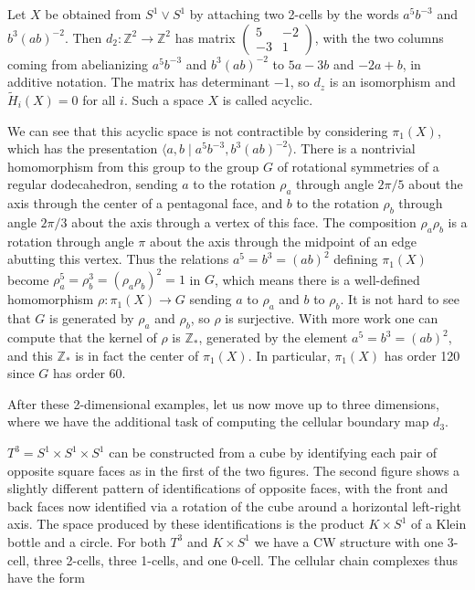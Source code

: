 \begin{example}
\label{ex:acyclic-space}
Let $X$ be obtained from $S^1 \vee S^1$ by attaching two 2-cells by the words $a^5 b^{-3}$ and $b^3(ab)^{-2}$. Then $d_2: \mathbb{Z}^2 \to \mathbb{Z}^2$ has matrix $\begin{pmatrix} 5 & -2 \\ -3 & 1 \end{pmatrix}$, with the two columns coming from abelianizing $a^5 b^{-3}$ and $b^3(ab)^{-2}$ to $5a - 3b$ and $-2a + b$, in additive notation. The matrix has determinant $-1$, so $d_z$ is an isomorphism and $\tilde{H}_i(X) = 0$ for all $i$. Such a space $X$ is called acyclic.
\end{example}

We can see that this acyclic space is not contractible by considering $\pi_1(X)$, which has the presentation $\langle a, b \mid a^5 b^{-3}, b^3(ab)^{-2} \rangle$. There is a nontrivial homomorphism from this group to the group $G$ of rotational symmetries of a regular dodecahedron, sending $a$ to the rotation $\rho_a$ through angle $2\pi/5$ about the axis through the center of a pentagonal face, and $b$ to the rotation $\rho_b$ through angle $2\pi/3$ about the axis through a vertex of this face. The composition $\rho_a \rho_b$ is a rotation through angle $\pi$ about the axis through the midpoint of an edge abutting this vertex. Thus the relations $a^5 = b^3 = (ab)^2$ defining $\pi_1(X)$ become $\rho_a^5 = \rho_b^3 = (\rho_a \rho_b)^2 = 1$ in $G$, which means there is a well-defined homomorphism $\rho: \pi_1(X) \to G$ sending $a$ to $\rho_a$ and $b$ to $\rho_b$. It is not hard to see that $G$ is generated by $\rho_a$ and $\rho_b$, so $\rho$ is surjective. With more work one can compute that the kernel of $\rho$ is $\mathbb{Z}_*$, generated by the element $a^5 = b^3 = (ab)^2$, and this $\mathbb{Z}_*$ is in fact the center of $\pi_1(X)$. In particular, $\pi_1(X)$ has order 120 since $G$ has order 60.

After these 2-dimensional examples, let us now move up to three dimensions, where we have the additional task of computing the cellular boundary map $d_3$.

\begin{example}
\label{ex:three-torus}
$T^3 = S^1 \times S^1 \times S^1$ can be constructed from a cube by identifying each pair of opposite square faces as in the first of the two figures. The second figure shows a slightly different pattern of identifications of opposite faces, with the front and back faces now identified via a rotation of the cube around a horizontal left-right axis. The space produced by these identifications is the product $K \times S^1$ of a Klein bottle and a circle. For both $T^3$ and $K \times S^1$ we have a CW structure with one 3-cell, three 2-cells, three 1-cells, and one 0-cell. The cellular chain complexes thus have the form
\end{example}



